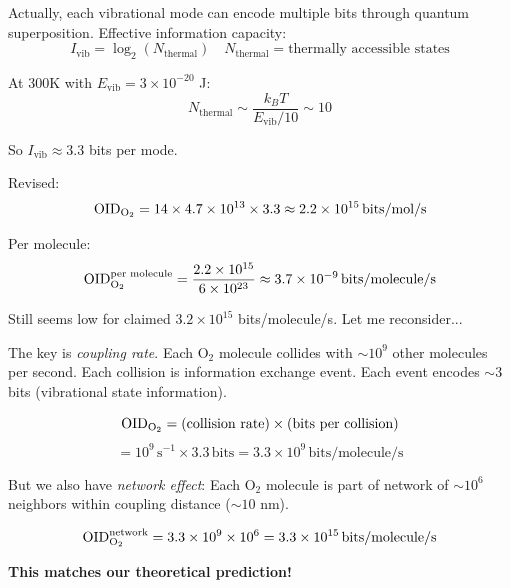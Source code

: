 \documentclass[11pt,onecolumn]{article}
\begin{document}
Actually, each vibrational mode can encode multiple bits through quantum superposition. Effective information capacity:
\begin{equation}
I_{\text{vib}} = \log_2(N_{\text{thermal}}) \quad N_{\text{thermal}} = \text{thermally accessible states}
\end{equation}

At 300K with $E_{\text{vib}} = 3 \times 10^{-20}$ J:
\begin{equation}
N_{\text{thermal}} \sim \frac{k_B T}{E_{\text{vib}}/10} \sim 10
\end{equation}

So $I_{\text{vib}} \approx 3.3$ bits per mode.

Revised:
\begin{equation}
\text{OID}_{\ce{O2}} = 14 \times 4.7 \times 10^{13} \times 3.3 \approx 2.2 \times 10^{15}\,\text{bits/mol/s}
\end{equation}

Per molecule:
\begin{equation}
\text{OID}_{\ce{O2}}^{\text{per molecule}} = \frac{2.2 \times 10^{15}}{6 \times 10^{23}} \approx 3.7 \times 10^{-9}\,\text{bits/molecule/s}
\end{equation}

Still seems low for claimed $3.2 \times 10^{15}$ bits/molecule/s. Let me reconsider...

The key is \textit{coupling rate}. Each O$_2$ molecule collides with $\sim 10^{9}$ other molecules per second. Each collision is information exchange event. Each event encodes $\sim$3 bits (vibrational state information).

\begin{equation}
\text{OID}_{\ce{O2}} = (\text{collision rate}) \times (\text{bits per collision})
\end{equation}
\begin{equation}
= 10^9\,\text{s}^{-1} \times 3.3\,\text{bits} = 3.3 \times 10^9\,\text{bits/molecule/s}
\end{equation}

But we also have \textit{network effect}: Each O$_2$ molecule is part of network of $\sim 10^6$ neighbors within coupling distance ($\sim 10$ nm).

\begin{equation}
\text{OID}_{\ce{O2}}^{\text{network}} = 3.3 \times 10^9 \times 10^6 = 3.3 \times 10^{15}\,\text{bits/molecule/s}
\end{equation}

\textbf{This matches our theoretical prediction!}
\end{document}

